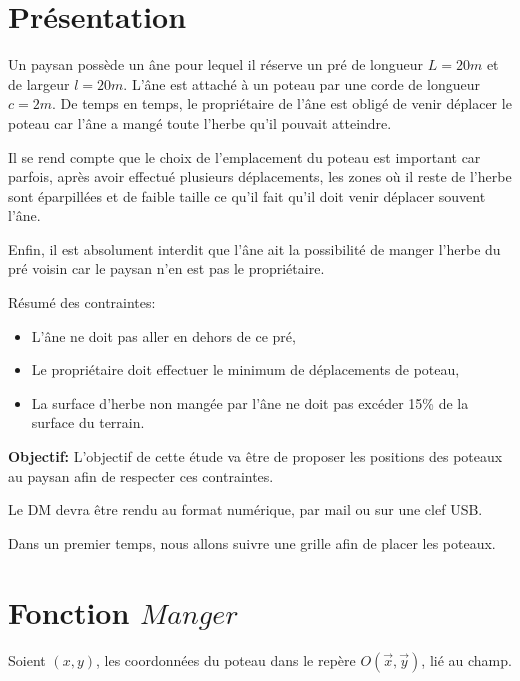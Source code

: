 








\section{Présentation}

Un paysan possède un âne pour lequel il réserve un pré de longueur $L=20m$ et de largeur $l=20m$. L'âne est attaché à un poteau par une corde de longueur $c=2m$. De temps en temps, le propriétaire de l'âne est obligé de venir déplacer le poteau car l'âne a mangé toute l'herbe qu'il pouvait atteindre.

Il se rend compte que le choix de l'emplacement du poteau est important car parfois, après avoir effectué plusieurs déplacements, les zones où il reste de l'herbe sont éparpillées et de faible taille ce qu'il fait qu'il doit venir déplacer souvent l'âne.

Enfin, il est absolument interdit que l'âne ait la possibilité de manger l'herbe du pré voisin car le paysan n'en est pas le propriétaire.

Résumé des contraintes:
\begin{itemize}
 \item L'âne ne doit pas aller en dehors de ce pré,
 \item Le propriétaire doit effectuer le minimum de déplacements de poteau,
 \item La surface d'herbe non mangée par l'âne ne doit pas excéder 15\% de la surface du terrain.
\end{itemize}

\textbf{Objectif:} L'objectif de cette étude va être de proposer les positions des poteaux au paysan afin de respecter ces contraintes.

Le DM devra être rendu au format numérique, par mail ou sur une clef USB.

Dans un premier temps, nous allons suivre une grille afin de placer les poteaux.

\section{Fonction $Manger$}

Soient $(x,y)$, les coordonnées du poteau dans le repère $O(\overrightarrow{x}, \overrightarrow{y})$, lié au champ.

